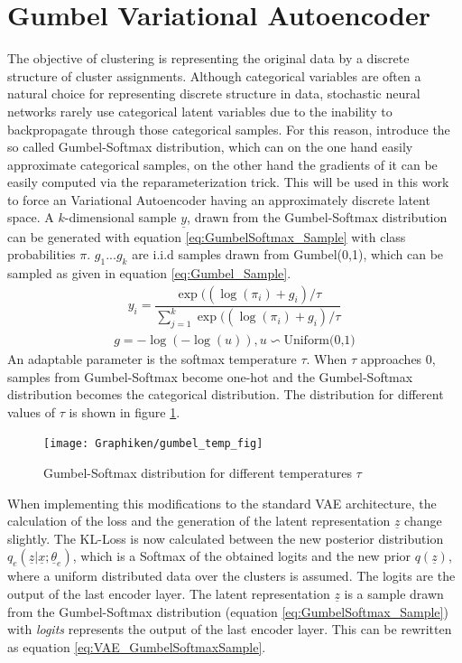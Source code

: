 \documentclass[12pt,DIV14,BCOR12mm,a4paper,footexclude,headinclude,halfparskip-,twoside,openright,cleardoubleempty,idxtotoc,bibtotoc,listtotoc,abstracton]{scrreprt} %
\numberwithin{equation}{chapter}
\begin{document}
\section{Gumbel Variational Autoencoder}
The objective of clustering is representing the original data by a discrete structure of cluster assignments. Although categorical variables are often a natural choice for representing discrete structure in data, stochastic neural networks rarely use categorical latent variables due to the inability to backpropagate through those categorical samples. For this reason, \cite{Jang17GumbelVAE} introduce the so called Gumbel-Softmax distribution, which can on the one hand easily approximate categorical samples, on the other hand the gradients of it can be easily computed via the reparameterization trick. This will be used in this work to force an Variational Autoencoder having an approximately discrete latent space. A $k$-dimensional sample $\underline{y}$, drawn from the Gumbel-Softmax distribution can be generated with equation \ref{eq:GumbelSoftmax_Sample} with class probabilities $\pi$. $g_1...g_k$ are i.i.d samples drawn from Gumbel(0,1), which can be sampled as given in equation \ref{eq:Gumbel_Sample}.
\begin{align}
	y_i = \dfrac{\exp((\log(\pi_i)+g_i)/\tau}{\sum_{j=1}^{k}\exp((\log(\pi_i)+g_i)/\tau}\label{eq:GumbelSoftmax_Sample}
\end{align}
\begin{align}
	g = -\log(-\log(u)), u \backsim \textrm{Uniform(0,1)}\label{eq:Gumbel_Sample}
\end{align}
An adaptable parameter is the softmax temperature $\tau$. When $\tau$ approaches $0$, samples from Gumbel-Softmax become one-hot and the Gumbel-Softmax distribution becomes the categorical distribution. The distribution for different values of $\tau$ is shown in figure \ref{fig:Gumbel-Softmax_Distr}.
\begin{figure}[htb!]
	\centering
	\texttt{[image: Graphiken/gumbel\_temp\_fig]}
	\caption{Gumbel-Softmax distribution for different temperatures $\tau$ \cite{Jang17GumbelVAE}}
	\label{fig:Gumbel-Softmax_Distr}
\end{figure}
When implementing this modifications to the standard VAE architecture, the calculation of the loss and the generation of the latent representation $\underline{z}$ change slightly. The KL-Loss is now calculated between the new posterior distribution $q_e(\underline{z}|\underline{x};\underline{\theta}_e)$, which is a Softmax of the obtained logits and the new prior $q(\underline{z})$, where a uniform distributed data over the clusters is assumed. The logits are the output of the last encoder layer. The latent representation $\underline{z}$ is a sample drawn from the Gumbel-Softmax distribution (equation \ref{eq:GumbelSoftmax_Sample}) with \textit{logits} represents the output of the last encoder layer. This can be rewritten as equation \ref{eq:VAE_GumbelSoftmaxSample}.
\end{document}
